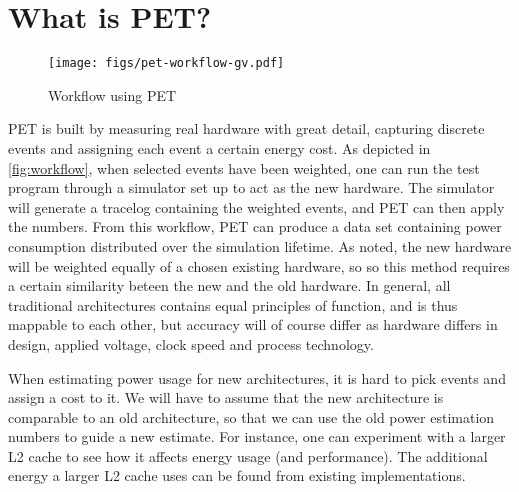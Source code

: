 \section{What is PET?}

\begin{figure}
    \texttt{[image: figs/pet-workflow-gv.pdf]}
    \caption{Workflow using PET}
    \label{fig:workflow}
\end{figure}

PET is built by measuring real hardware with great detail, capturing discrete
events and assigning each event a certain energy cost. As depicted in
\autoref{fig:workflow}, when selected events have been weighted, one can run the
test program through a simulator set up to act as the new hardware. The simulator
will generate a tracelog containing the weighted events, and PET can then apply
the numbers. From this workflow, PET can produce a data set containing power
consumption distributed over the simulation lifetime. As noted, the new hardware
will be weighted equally of a chosen existing hardware, so so this method
requires a certain similarity beteen the new and the old hardware. In general,
all traditional architectures contains equal principles of function, and is thus
mappable to each other, but accuracy will of course differ as hardware differs
in design, applied voltage, clock speed and process technology.

When estimating power usage for new architectures, it is hard to pick events and
assign a cost to it. We will have to assume that the new architecture is
comparable to an old architecture, so that we can use the old power estimation
numbers to guide a new estimate. For instance, one can experiment with a
larger L2 cache to see how it affects energy usage (and performance). The
additional energy a larger L2 cache uses can be found from existing
implementations.
